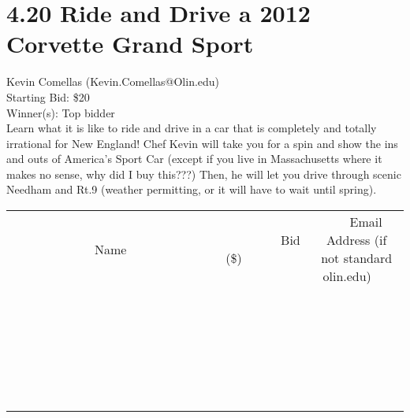 \documentclass[11pt]{article}
\begin{document}
\section*{4.20 Ride and Drive a 2012 Corvette Grand Sport}
Kevin Comellas (Kevin.Comellas@Olin.edu) \\
Starting Bid: \$20 \\
Winner(s): 
Top bidder \\
Learn what it is like to ride and drive in a car that is completely and totally irrational for New England! Chef Kevin will take you for a spin and show the ins and outs of America's Sport Car (except if you live in Massachusetts where it makes no sense, why did I buy this???) Then, he will let you drive through scenic Needham and Rt.9 (weather permitting, or it will have to wait until spring). \\[6ex]
\begin{tabular}{c c c}
~~~~~~~~~~~~~Name~~~~~~~~~~~~~ & ~~~~~~~~~Bid (\$)~~~~~~~~~ & ~~~Email Address (if not standard olin.edu)~~~ \\
 & & \\
\hline
 & & \\
\hline
 & & \\
\hline
 & & \\
\hline
 & & \\
\hline
 & & \\
\hline
 & & \\
\hline
 & & \\
\hline
 & & \\
\hline
 & & \\
\hline
 & & \\
\hline
 & & \\
\hline
 & & \\
\hline
 & & \\
\hline
 & & \\
\hline
 & & \\
\hline
 & & \\
\hline
 & & \\
\hline
 & & \\
\hline
 & & \\
\hline
 & & \\
\hline
 & & \\
\hline
 & & \\
\hline
 & & \\
\hline
 & & \\
\hline
 & & \\
\hline
\end{tabular}
\clearpage
\end{document}
